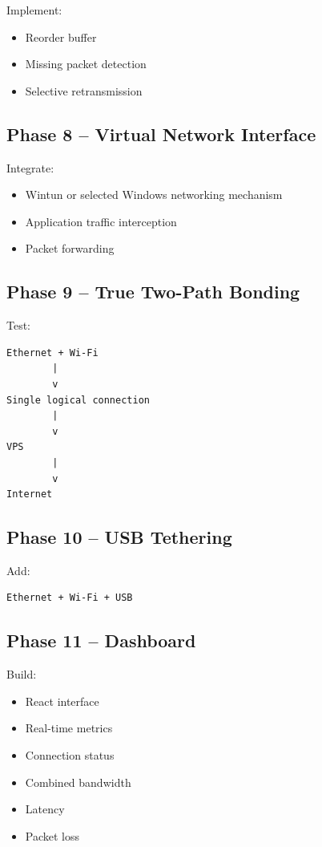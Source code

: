 \documentclass[12pt,a4paper]{article}
\begin{document}
Implement:

\begin{itemize}
    \item Reorder buffer
    \item Missing packet detection
    \item Selective retransmission
\end{itemize}

\subsection{Phase 8 -- Virtual Network Interface}

Integrate:

\begin{itemize}
    \item Wintun or selected Windows networking mechanism
    \item Application traffic interception
    \item Packet forwarding
\end{itemize}

\subsection{Phase 9 -- True Two-Path Bonding}

Test:

\begin{verbatim}
Ethernet + Wi-Fi
        |
        v
Single logical connection
        |
        v
VPS
        |
        v
Internet
\end{verbatim}

\subsection{Phase 10 -- USB Tethering}

Add:

\begin{verbatim}
Ethernet + Wi-Fi + USB
\end{verbatim}

\subsection{Phase 11 -- Dashboard}

Build:

\begin{itemize}
    \item React interface
    \item Real-time metrics
    \item Connection status
    \item Combined bandwidth
    \item Latency
    \item Packet loss
\end{itemize}
\end{document}
